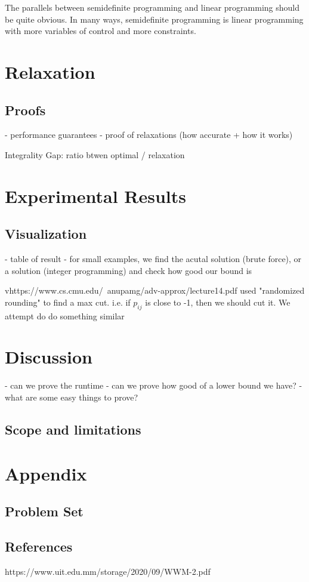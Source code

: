 \documentclass{article}
\begin{document}
The parallels between semidefinite programming and linear programming should be quite obvious. In many ways, semidefinite programming is linear programming with more variables of control and more constraints.


\section{Relaxation}   %
\subsection{Proofs}
- performance guarantees
- proof of relaxations (how accurate + how it works)


Integrality Gap: ratio btwen optimal / relaxation 



\section{Experimental Results}
\subsection{Visualization}
- table of result
- for small examples, we find the acutal solution (brute force), or a solution (integer programming) and check how 
good our bound is

vhttps://www.cs.cmu.edu/~anupamg/adv-approx/lecture14.pdf used "randomized rounding" to find a max cut.
i.e. if $p_{ij}$ is close to -1, then we should cut it. We attempt do do something similar

\section{Discussion}


- can we prove the runtime
- can we prove how good of a lower bound we have?
- what are some easy things to prove?

\subsection{Scope and limitations}

\section{Appendix}
\newpage
\subsection{Problem Set} 

\newpage
\subsection{References}
https://www.uit.edu.mm/storage/2020/09/WWM-2.pdf
\end{document}
